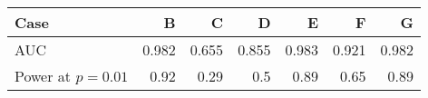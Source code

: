 \begin{tabular}{l|rrrrrr}
Case & B & C & D & E & F & G \\ \hline
AUC &  0.982  &  0.655  &  0.855  &  0.983  &  0.921  &  0.982 \\ Power at $p=0.01$ & 0.92  &  0.29  &  0.5  &  0.89  &  0.65  &  0.89 \\
 \end{tabular}
